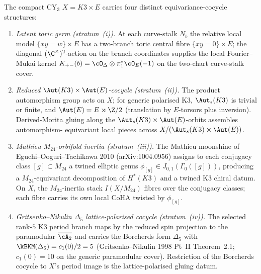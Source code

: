\begin{theorem}
\label{gluing:thm:k3xe-four-stratum}
The compact CY$_3$ $X = K3 \times E$ carries four distinct
equivariance-cocycle structures:
\begin{enumerate}[label=\textup{(\roman*)}]
 \item \emph{Latent toric germ (stratum~(i)).} At each curve-stalk
 $N_b$ the relative local model $\{xy = w\} \times E$ has a
 two-branch toric central fibre $\{xy=0\}\times E$; the diagonal
 $(\C^\times)^2$-action on the branch coordinates supplies the local
 Fourier--Mukai kernel \(K_{+-}(b)=
 \cO_\Delta\otimes\pi_1^*\cO_E(-1)\) on the two-chart curve-stalk
 cover.
 \item \emph{Reduced $\Aut(K3) \times \Aut(E)$-cocycle (stratum~(ii)).}
 The product automorphism group acts on $X$; for generic polarised
 K3, $\Aut_s(K3)$ is trivial or finite, and $\Aut(E) = E \rtimes \Z/2$
 (translation by $E$-torsors plus inversion). Derived-Morita gluing
 along the $\Aut_s(K3) \times \Aut(E)$-orbits assembles automorphism-
 equivariant local pieces across $X / (\Aut_s(K3) \times \Aut(E))$.
 \item \emph{Mathieu $M_{24}$-orbifold inertia (stratum~(iii)).}
 The Mathieu moonshine of Eguchi--Ooguri--Tachikawa 2010
 (arXiv:1004.0956) assigns to each conjugacy class $[g] \subset
 M_{24}$ a twined elliptic genus $\phi_{[g]} \in J_{0,1}(\Gamma_0([g]))$,
 producing a $M_{24}$-equivariant decomposition of $H^*(K3)$ and
 a twined K3 chiral datum. On $X$, the $M_{24}$-inertia stack
 $I(X/M_{24})$ fibres over the conjugacy classes; each fibre carries
 its own local CoHA twisted by $\phi_{[g]}$.
 \item \emph{Gritsenko--Nikulin $\Delta_5$ lattice-polarised cocycle
 (stratum~(iv)).} The selected rank-\(5\) K3 period branch maps by the reduced spin projection to the paramodular
 $\overline{\cA_2}$ and carries the Borcherds form $\Delta_5$ with
 $\kBKM(\Delta_5) = c_1(0)/2 = 5$ (Gritsenko--Nikulin 1998 Pt~II
 Theorem~2.1; $c_1(0) = 10$ on the generic paramodular cover).
 Restriction of the Borcherds cocycle to $X$'s period image is the
 lattice-polarised gluing datum.
\end{enumerate}
\end{theorem}


